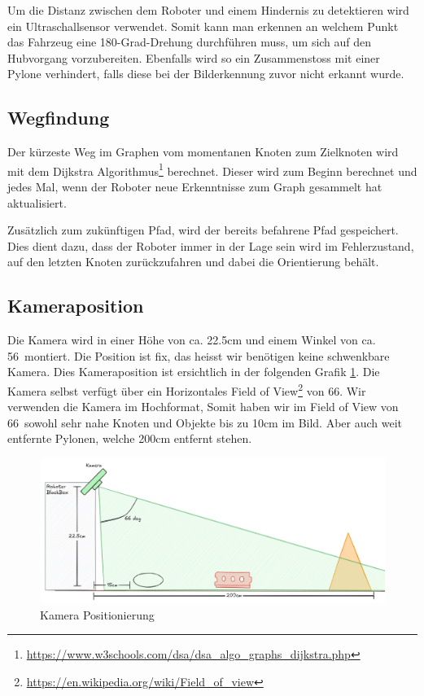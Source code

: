Um die Distanz zwischen dem Roboter und einem Hindernis zu detektieren wird ein Ultraschallsensor verwendet. Somit kann man erkennen an welchem Punkt das Fahrzeug eine 180-Grad-Drehung durchführen muss, um sich auf den Hubvorgang vorzubereiten. Ebenfalls wird so ein Zusammenstoss mit einer Pylone verhindert, falls diese bei der Bilderkennung zuvor nicht erkannt wurde.

\subsection{Wegfindung}

Der kürzeste Weg im Graphen vom momentanen Knoten zum Zielknoten wird mit dem Dijkstra Algorithmus\footnote{\url{https://www.w3schools.com/dsa/dsa\_algo\_graphs\_dijkstra.php}} berechnet. Dieser wird zum Beginn berechnet und jedes Mal, wenn der Roboter neue Erkenntnisse zum Graph gesammelt hat aktualisiert. 

Zusätzlich zum zukünftigen Pfad, wird der bereits befahrene Pfad gespeichert. Dies dient dazu, dass der Roboter immer in der Lage sein wird im Fehlerzustand, auf den letzten Knoten zurückzufahren und dabei die Orientierung behält.

\subsection{Kameraposition}

Die Kamera wird in einer Höhe von ca. 22.5cm und einem Winkel von ca. 56\textdegree\ montiert. Die Position ist fix, das heisst wir benötigen keine schwenkbare Kamera. Dies Kameraposition ist ersichtlich in der folgenden Grafik \ref{fig:camera-position-concept}.
Die Kamera selbst verfügt über ein Horizontales Field of View\footnote{\url{https://en.wikipedia.org/wiki/Field_of_view}} von 66\textdegree. Wir verwenden die Kamera im Hochformat, Somit haben wir im Field of View von 66\textdegree\ sowohl sehr nahe Knoten und Objekte bis zu 10cm im Bild. Aber auch weit entfernte Pylonen, welche 200cm entfernt stehen.

\begin{figure}[H]
    \centering
    \includegraphics[width=1\linewidth]{assets//informatik-prototyp//camera/camera_position.png}
    \caption{Kamera Positionierung}
    \label{fig:camera-position-concept}
\end{figure}



